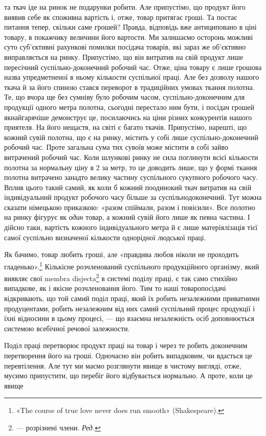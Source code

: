\parcont{}  %
та ткач іде на ринок не подарунки робити. Але припустімо, що
продукт його виявив себе як споживна вартість і, отже, товар
притягає гроші. Та постає питання тепер, скільки саме грошей?
Правда, відповідь вже антициповано в ціні товару, в покажчику
величини його вартости. Ми залишаємо осторонь можливі суто
суб’єктивні рахункові помилки посідача товарів, які зараз же
об’єктивно виправляється на ринку. Припустімо, що він витратив
на свій продукт лише пересічний суспільно-доконечний
робочий час. Отже, ціна товару є лише грошова назва упредметненої
в ньому кількости суспільної праці. Але без дозволу нашого
ткача й за його спиною стався переворот в традиційних умовах
ткання полотна. Те, що вчора ще без сумніву було робочим часом,
суспільно-доконечним для продукції одного метра полотна,
сьогодні перестало ним бути, і посідач грошей якнайгарячіше
демонструє це, посилаючись на ціни різних конкурентів нашого
приятеля. На його нещастя, на світі є багато ткачів. Припустімо,
нарешті, що кожний сувій полотна, що є на ринку, містить у
собі лише суспільно-доконечний робочий час. Проте загальна
сума тих сувоїв може містити в собі зайво витрачений робочий
час. Коли шлункові ринку не сила поглинути всієї кількости
полотна за нормальну ціну в 2 за метр, то це доводить
лише, що у формі ткання полотна витрачено занадто велику
частину суспільного сукупного робочого часу. Вплив цього
такий самий, як коли б кожний поодинокий ткач витратив на
свій індивідуальний продукт робочого часу більше за суспільнодоконечний.
Тут можна сказати німецькою приказкою: «разом
спіймали, разом і повісили». Все полотно на ринку фігурує як
\emph{один} товар, а кожний сувій його лише як певна частина. І дійсно
таки, вартість кожного індивідуального метра й є лише матеріялізація
тієї самої суспільно визначеної кількости однорідної
людської праці.

Як бачимо, товар любить гроші, але «правдива любов ніколи
не проходить гладенько».\footnote*{
«The course of true love never does run smooth» (Shakespeare).
} Кількісне розчленований суспільного
продукційного організму, який виявляє свої membra disjecta\footnote*{
— розрізнені члени. \emph{Ред.}
}
в системі поділу праці, є так само стихійно випадкове, як і якісне
розчленовання його. Тим то наші товаропосідачі відкривають, що
той самий поділ праці, який їх робить незалежними приватними
продуцентами, робить незалежним від них самий суспільний процес
продукції і їхні відносини в цьому процесі, — що взаємна
незалежність осіб доповнюється системою всебічної речової залежности.

Поділ праці перетворює продукт праці на товар і через те
робить доконечним перетворення його на гроші. Одночасно він
робить випадковим, чи вдасться це перевтілення. Але тут ми маємо
розглянути явище в чистому вигляді, отже, мусимо припустити,
що перебіг його відбувається нормально. А проте, коли це явище
\parbreak{}  %
